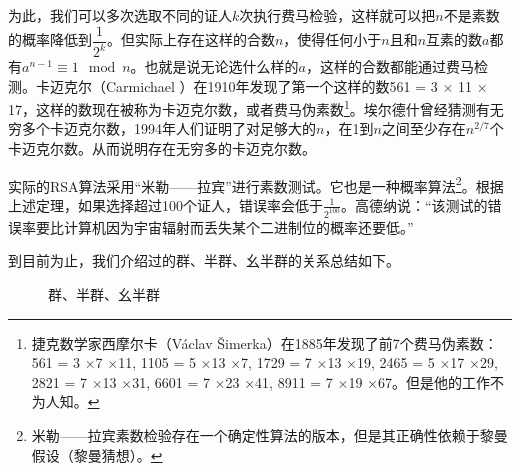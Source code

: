 \documentclass{article}
\begin{document}
为此，我们可以多次选取不同的证人$k$次执行费马检验，这样就可以把$n$不是素数的概率降低到$\dfrac{1}{2^k}$。但实际上存在这样的合数$n$，使得任何小于$n$且和$n$互素的数$a$都有$a^{n-1} \equiv 1 \mod n$。也就是说无论选什么样的$a$，这样的合数都能通过费马检测。卡迈克尔（Carmichael ）在1910年发现了第一个这样的数561 = 3 $\times$ 11 $\times$ 17，这样的数现在被称为卡迈克尔数，或者费马伪素数\footnote{捷克数学家西摩尔卡（Václav Šimerka）在1885年发现了前7个费马伪素数：561 = 3 $\times$7 $\times$11, 1105 = 5 $\times$13 $\times$7, 1729 = 7 $\times$13 $\times$19, 2465 = 5 $\times$17 $\times$29, 2821 = 7 $\times$13 $\times$31, 6601 = 7 $\times$23 $\times$41, 8911 = 7 $\times$19 $\times$67。但是他的工作不为人知。}。埃尔德什曾经猜测有无穷多个卡迈克尔数，1994年人们证明了对足够大的$n$，在1到$n$之间至少存在$n^{2/7}$个卡迈克尔数。从而说明存在无穷多的卡迈克尔数\cite{Wiki-Carmichael-number}。

实际的RSA算法采用“米勒——拉宾”进行素数测试。它也是一种概率算法\footnote{米勒——拉宾素数检验存在一个确定性算法的版本，但是其正确性依赖于黎曼假设（黎曼猜想）\cite{Wiki-Miller-Rabin}。}。根据上述定理，如果选择超过100个证人，错误率会低于$\frac{1}{2^{100}}$。高德纳说：“该测试的错误率要比计算机因为宇宙辐射而丢失某个二进制位的概率还要低。”

\vspace{5mm}

到目前为止，我们介绍过的群、半群、幺半群的关系总结如下。

\begin{figure}[htbp]
\centering
{}
\caption{群、半群、幺半群}
\label{fig:groups}
\end{figure}
\end{document}
